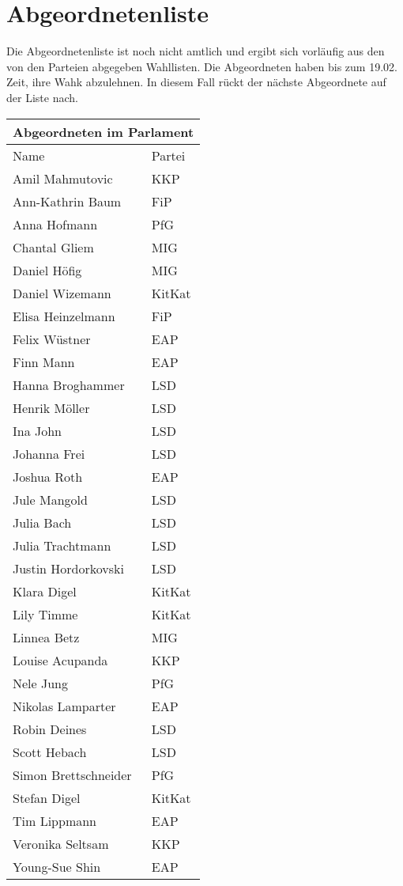 \documentclass{sasbase}
\begin{document}
\newpage

\section{Abgeordnetenliste}

Die Abgeordnetenliste ist noch nicht amtlich und ergibt sich vorläufig aus den von den Parteien abgegeben Wahllisten. Die Abgeordneten haben bis zum 19.02. Zeit, ihre Wahk
abzulehnen. In diesem Fall rückt der nächste Abgeordnete auf der Liste nach. 

\begin{center}
    \begin{tabular}{ |p{5cm}|p{3cm}| }
     \hline
     \multicolumn{2}{|c|}{Abgeordneten im Parlament} \\
     \hline
     Name & Partei \\
     \hline
    Amil Mahmutovic & KKP \\
    Ann-Kathrin Baum & FiP\\
    Anna Hofmann & PfG\\
    Chantal Gliem & MIG\\
    Daniel Höfig & MIG\\
    Daniel Wizemann & KitKat\\
    Elisa Heinzelmann & FiP\\
    Felix Wüstner & EAP\\
    Finn Mann & EAP\\
    Hanna Broghammer & LSD\\
    Henrik Möller & LSD\\
    Ina John & LSD\\
    Johanna Frei & LSD\\
    Joshua Roth & EAP\\
    Jule Mangold & LSD\\
    Julia Bach & LSD\\
    Julia Trachtmann & LSD\\
    Justin Hordorkovski & LSD\\
    Klara Digel & KitKat\\
    Lily Timme & KitKat\\
    Linnea Betz & MIG\\
    Louise Acupanda & KKP\\
    Nele Jung & PfG\\
    Nikolas Lamparter & EAP\\
    Robin Deines & LSD\\
    Scott Hebach & LSD\\
    Simon Brettschneider & PfG\\
    Stefan Digel & KitKat\\
    Tim Lippmann & EAP\\
    Veronika Seltsam & KKP\\
    Young-Sue Shin & EAP\\
     \hline
    \end{tabular}
\end{center}
\end{document}
